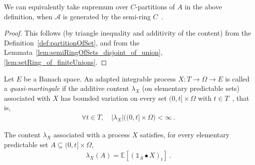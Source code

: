 \begin{lemma}\label{lem:contentBoundedVariation_equivOnGenerator}
  We can equivalently take supremum over $C$-partitions of $A$ in the above
  definition, when $\mathcal{A}$ is generated by the semi-ring $C$~.
\end{lemma}

\begin{proof}
  This follows (by triangle inequality and additivity of the content)
  from the Definition~\ref{def:partitionOfSet},
  and from the Lemmata~\ref{lem:semiRingOfSets_disjoint_of_union},
  \ref{lem:setRing_of_finiteUnions}.
\end{proof}

\begin{definition}\label{def:Quasimartingale}
Let $E$ be a Banach space.
An adapted integrable process $X : T \to \Omega \to E$ is called a
\emph{quasi-martingale} if the additive content $\lambda_X$ (on elementary predictable sets)
associated with $X$ has bounded variation on every set $(0, t] \times \Omega$ with $t \in T$~, that is,
\begin{align*}
  \forall t \in T, \quad \vert \lambda_X \vert\big((0, t] \times \Omega\big) < \infty
  \: .
\end{align*}
\end{definition}

\begin{lemma}\label{lem:contentEquivElementaryIntegral}
  The content $\lambda_X$ associated with a process $X$ satisfies,
  for every elementary predictable set $A\subseteq (0, t] \times \Omega$,
\begin{align*}
  \lambda_X(A) = \mathbb{E}[(\mathbb{1}_A \bullet X)_t]
  \: .
\end{align*}
\end{lemma}

